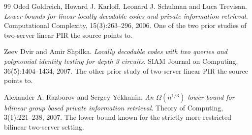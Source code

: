 \documentclass{aicr-conjecture}
\begin{document}
\begin{aicrbibliography}{99}
Oded Goldreich, Howard J. Karloff, Leonard J. Schulman and Luca Trevisan.
\emph{Lower bounds for linear locally decodable codes and private
information retrieval}.
Computational Complexity, 15(3):263--296, 2006.
One of the two prior studies of two-server linear PIR the source points
to.

Zeev Dvir and Amir Shpilka.
\emph{Locally decodable codes with two queries and polynomial identity
testing for depth 3 circuits}.
SIAM Journal on Computing, 36(5):1404--1434, 2007.
The other prior study of two-server linear PIR the source points to.

Alexander A. Razborov and Sergey Yekhanin.
\emph{An $\Omega(n^{1/3})$ lower bound for bilinear group based private
information retrieval}.
Theory of Computing, 3(1):221--238, 2007.
The lower bound known for the strictly more restricted bilinear
two-server setting.

\end{aicrbibliography}
\end{document}
